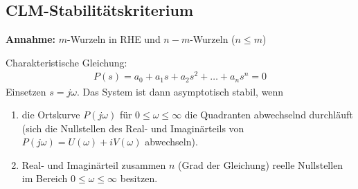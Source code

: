 \subsection{CLM-Stabilitätskriterium}
\begin{tcolorbox}[colback=white!10!white,
                  colframe=green!30!black,
                  title=CLM-Kriterium] 
    \textbf{Annahme:}
    $m$-Wurzeln in RHE  und $n-m$-Wurzeln ($n \leq m$)
    
    Charakteristische Gleichung:
    \begin{align*}
        P(s) = a_0 + a_1s + a_2s^2 + \ldots + a_n s^n = 0 
    \end{align*}
    Einsetzen $s = j\omega$.
    Das System ist dann asymptotisch stabil, wenn
    \begin{enumerate}
        \item die Ortskurve $P(j\omega)$  für $0 \leq \omega \leq \infty$ die 
            Quadranten abwechselnd durchläuft (sich die Nullstellen des Real- 
            und Imaginärteils von $P(j\omega) = U(\omega)+iV(\omega)$ 
            abwechseln).
        \item Real- und Imaginärteil zusammen $n$ (Grad der Gleichung) reelle 
            Nullstellen im Bereich $0 \leq \omega \leq \infty$ besitzen.
    \end{enumerate}
    
    \tcblower
    

\end{tcolorbox}
